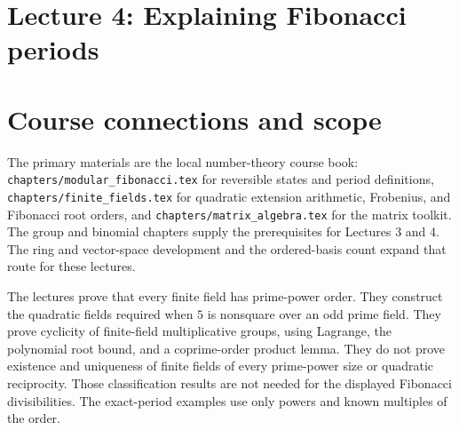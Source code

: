\documentclass[11pt]{article}
\begin{document}
\section*{Lecture 4: Explaining Fibonacci periods}

\clearpage
\section*{Course connections and scope}
The primary materials are the local number-theory course book:
\texttt{chapters/modular\_fibonacci.tex} for reversible states and period
definitions, \texttt{chapters/finite\_fields.tex} for quadratic extension
arithmetic, Frobenius, and Fibonacci root orders, and
\texttt{chapters/matrix\_algebra.tex} for the matrix toolkit.
The group and binomial chapters supply the prerequisites for Lectures 3 and 4.
The ring and vector-space development and the ordered-basis count expand
that route for these lectures.

The lectures prove that every finite field has prime-power order. They
construct the quadratic fields required when $5$ is nonsquare over an
odd prime field. They prove cyclicity of finite-field multiplicative groups, using
Lagrange, the polynomial root bound, and a coprime-order product lemma.
They do not prove existence and uniqueness of finite fields of every
prime-power size or quadratic reciprocity. Those classification results
are not needed for the displayed Fibonacci divisibilities. The exact-period examples use
only powers and known multiples of the order.
\end{document}
